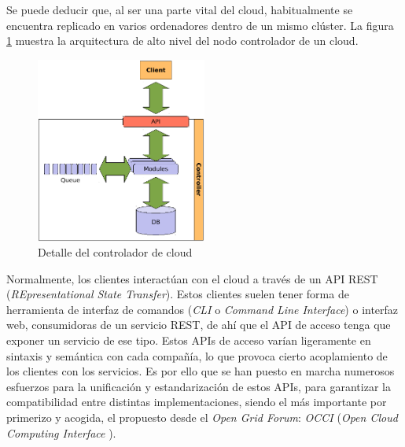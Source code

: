 Se puede deducir que, al ser una parte vital del cloud, habitualmente se encuentra replicado en varios ordenadores dentro de un mismo cl\'uster. La figura \ref{fig:cloudcontroller} muestra la arquitectura de alto nivel del nodo controlador de un cloud.\newline

\begin{figure}[tbp]
\begin{center}
\includegraphics[width=0.5\textwidth]{imagenes/005.pdf}
 \caption{Detalle del controlador de cloud}
\label{fig:cloudcontroller}
\end{center}
\end{figure}

Normalmente, los clientes interact\'uan con el cloud a trav\'es de un API REST (\emph{REpresentational State Transfer}). Estos clientes suelen tener forma de herramienta de interfaz de comandos (\emph{CLI} o \emph{Command Line Interface}) o interfaz web, consumidoras de un servicio REST, de ah\'i que el API de acceso tenga que exponer un servicio de ese tipo. Estos APIs de acceso var\'ian li\-ge\-ra\-men\-te en sintaxis y sem\'antica con cada compa\~n\'ia, lo que provoca cierto acoplamiento de los clientes con los servicios. Es por ello que se han puesto en marcha numerosos esfuerzos para la unificaci\'on y estandarizaci\'on de estos APIs, para garantizar la compatibilidad entre distintas implementaciones, siendo el m\'as importante por primerizo y acogida, el propuesto desde el \emph{Open Grid Forum}: \emph{OCCI} (\emph{Open Cloud Computing Interface} \cite{occisdraft}).\newline

